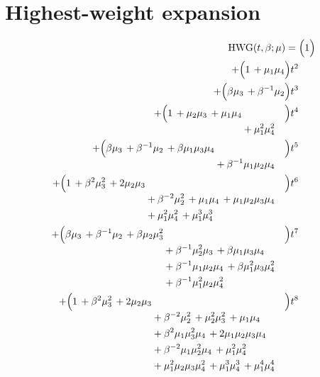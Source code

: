 \documentclass[10pt]{article}
\begin{document}
\section{Highest-weight expansion}
\[
\begin{aligned}
\mathrm{HWG}(t,\beta;\mu) ={}&
   \Bigl(1\Bigr) \\
  + \Bigl(1\,+\mu_1\mu_4\Bigr)t^{2} \\
  + \Bigl(\beta\mu_3\,+\beta^{-1}\mu_2\Bigr)t^{3} \\
  + \Bigl(\begin{aligned}[t]1\,+\mu_2\mu_3\,+\mu_1\mu_4 \\
  &{}+\mu_1^{2}\mu_4^{2}\end{aligned}\Bigr)t^{4} \\
  + \Bigl(\begin{aligned}[t]\beta\mu_3\,+\beta^{-1}\mu_2\,+\beta\mu_1\mu_3\mu_4 \\
  &{}+\beta^{-1}\mu_1\mu_2\mu_4\end{aligned}\Bigr)t^{5} \\
  + \Bigl(\begin{aligned}[t]1\,+\beta^{2}\mu_3^{2}\,+2\mu_2\mu_3 \\
  &{}+\beta^{-2}\mu_2^{2}\,+\mu_1\mu_4\,+\mu_1\mu_2\mu_3\mu_4 \\
  &{}+\mu_1^{2}\mu_4^{2}\,+\mu_1^{3}\mu_4^{3}\end{aligned}\Bigr)t^{6} \\
  + \Bigl(\begin{aligned}[t]\beta\mu_3\,+\beta^{-1}\mu_2\,+\beta\mu_2\mu_3^{2} \\
  &{}+\beta^{-1}\mu_2^{2}\mu_3\,+\beta\mu_1\mu_3\mu_4 \\
  &{}+\beta^{-1}\mu_1\mu_2\mu_4\,+\beta\mu_1^{2}\mu_3\mu_4^{2} \\
  &{}+\beta^{-1}\mu_1^{2}\mu_2\mu_4^{2}\end{aligned}\Bigr)t^{7} \\
  + \Bigl(\begin{aligned}[t]1\,+\beta^{2}\mu_3^{2}\,+2\mu_2\mu_3 \\
  &{}+\beta^{-2}\mu_2^{2}\,+\mu_2^{2}\mu_3^{2}\,+\mu_1\mu_4 \\
  &{}+\beta^{2}\mu_1\mu_3^{2}\mu_4\,+2\mu_1\mu_2\mu_3\mu_4 \\
  &{}+\beta^{-2}\mu_1\mu_2^{2}\mu_4\,+\mu_1^{2}\mu_4^{2} \\
  &{}+\mu_1^{2}\mu_2\mu_3\mu_4^{2}\,+\mu_1^{3}\mu_4^{3}\,+\mu_1^{4}\mu_4^{4}\end{aligned}\Bigr)t^{8} \\

\end{aligned}\]
\end{document}

